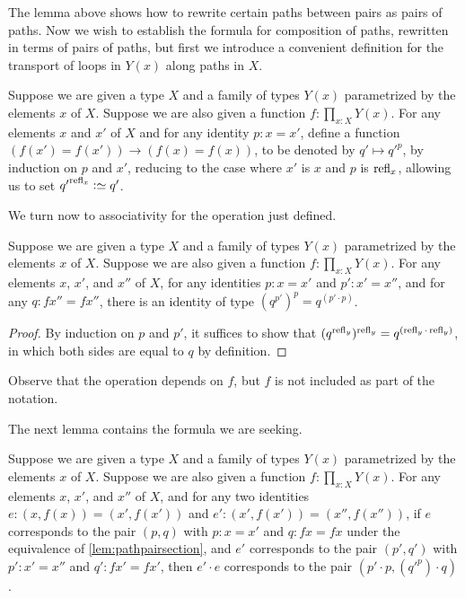 The lemma above shows how to rewrite certain paths between pairs as pairs of paths.  Now we wish to establish the formula for composition of
paths, rewritten in terms of pairs of paths, but first we introduce a convenient definition for the transport of loops in $Y(x)$ along paths in
$X$.

\begin{definition}\label{def:pathsectionaction}
  Suppose we are given a type $X$ and a family of types $Y(x)$ parametrized by the elements $x$ of $X$.
  Suppose we are also given a function $f : \prod_{x:X} Y(x)$.
  For any elements $x$ and $x'$ of $X$ and for any identity $p : x = x'$, define a function $(f(x') = f(x')) \to (f(x) = f(x))$, to be denoted
  by $q' \mapsto {q'} ^ p$, by induction on $p$ and $x'$, reducing to the case where $x'$ is $x$ and $p$ is $\refl x$, allowing us to
  set ${q'} ^{ \refl x } \defeq q'$.
\end{definition}  

We turn now to associativity for the operation just defined.

\begin{lemma}\label{def:pathsectionactionassoc}
  Suppose we are given a type $X$ and a family of types $Y(x)$ parametrized by the elements $x$ of $X$.
  Suppose we are also given a function $f : \prod_{x:X} Y(x)$.
  For any elements $x$, $x'$, and $x''$ of $X$, for any identities $p : x = x'$ and $p' : x' = x''$,
  and for any $q : f x'' = f x''$,
  there is an identity of type $ ( q ^{ p' }) ^ p = q ^{( p' \cdot p )}$.
\end{lemma}

\begin{proof}
  By induction on $p$ and $p'$, it suffices to show that $ ( q ^{ \refl y }) ^ { \refl y } = q ^{( \refl y \cdot \refl y )}$, in which both sides are
  equal to $q$ by definition.
\end{proof}

Observe that the operation depends on $f$, but $f$ is not included as part of the notation.

The next lemma contains the formula we are seeking.

\begin{lemma}\label{lem:pathpairsectionmult}
  Suppose we are given a type $X$ and a family of types $Y(x)$ parametrized by the elements $x$ of $X$.
  Suppose we are also given a function $f : \prod_{x:X} Y(x)$.
  For any elements $x$, $x'$, and $x''$ of $X$, and for any two identities $e : (x,f(x)) = (x',f(x'))$ and $e' : (x',f(x')) = (x'',f(x''))$,
  if $e$ corresponds to the pair $(p,q)$ with $p : x = x'$ and $q : f x = f x$ under the equivalence of \cref{lem:pathpairsection},
  and $e'$ corresponds to the pair $(p',q')$ with $p' : x' = x''$ and $q' : f x' = f x'$,
  then $e' \cdot e$ corresponds to the pair $(p' \cdot p , ({q'} ^ p) \cdot q)$.
\end{lemma}

